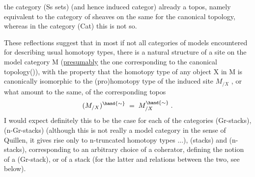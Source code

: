 
the category  (Ss sets) (and hence  induced categor)  already
a topos,  namely equivalent to the category of sheaves on the same for
the canonical topology,  whereas in the category (Cat)  this is not so.

These reflections suggest that in most if not all categories of
models encountered for describing usual homotopy types,  there is a 
natural structure of a site on the model category M (\uline{presumably} the one
corresponding to the canonical topology()), with the property that the
homotopy type of any object X in M is  canonically isomorphic to the
(pro)homotopy type of the induced site $M_{/X}$ ,  or what amount to the same,
of the corresponding topos
\[ (M_{/X})^{\hand{\sim}} \;=\; M^{\hand{\sim}}_{/X} \;. \]
I would expect definitely this to be the case for each of the categories
(Gr-stacks), (n-Gr-stacks) (although this is not really a model category
in the sense of Quillen, it gives rise only to n-truncated homotopy
types ...),  (stacks)  and (n-stacks),  corresponding to an arbitrary \margin{$\lceil$}
choice of a coherator,  defining the notion of a (Gr-stack),  or of a \margin{$[$}
stack  (for the latter and relations between the two,  see below). \margin{$\lfloor$}

